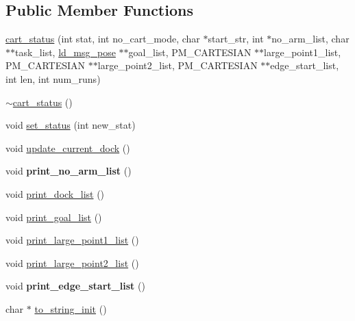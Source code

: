 \subsection*{Public Member Functions}
\begin{DoxyCompactItemize}
\item 
\mbox{\hyperlink{classcart__status_ac9302583f7f24fbc6c205a81416ff397}{cart\+\_\+status}} (int stat, int no\+\_\+cart\+\_\+mode, char $\ast$start\+\_\+str, int $\ast$no\+\_\+arm\+\_\+list, char $\ast$$\ast$task\+\_\+list, \mbox{\hyperlink{structld__msg__pose}{ld\+\_\+msg\+\_\+pose}} $\ast$$\ast$goal\+\_\+list, P\+M\+\_\+\+C\+A\+R\+T\+E\+S\+I\+AN $\ast$$\ast$large\+\_\+point1\+\_\+list, P\+M\+\_\+\+C\+A\+R\+T\+E\+S\+I\+AN $\ast$$\ast$large\+\_\+point2\+\_\+list, P\+M\+\_\+\+C\+A\+R\+T\+E\+S\+I\+AN $\ast$$\ast$edge\+\_\+start\+\_\+list, int len, int num\+\_\+runs)
\item 
\mbox{\hyperlink{classcart__status_a36ae36b8682afa50ecaa568285b1b32c}{$\sim$cart\+\_\+status}} ()
\item 
void \mbox{\hyperlink{classcart__status_a5db1241aff0bd874c8d108666ec8b323}{set\+\_\+status}} (int new\+\_\+stat)
\item 
void \mbox{\hyperlink{classcart__status_a25c8b8f4c2d8b516284f9cb463f007a8}{update\+\_\+current\+\_\+dock}} ()
\item 
\mbox{\label{classcart__status_adec6fe0924beb76adcc53ad15b9a2034}} 
void {\bfseries print\+\_\+no\+\_\+arm\+\_\+list} ()
\item 
void \mbox{\hyperlink{classcart__status_ae58ecd2c7d79aa9d35eec0bbfd1c7a32}{print\+\_\+dock\+\_\+list}} ()
\item 
void \mbox{\hyperlink{classcart__status_a07d3f2bf7b4e430645ae22ffb46143cb}{print\+\_\+goal\+\_\+list}} ()
\item 
void \mbox{\hyperlink{classcart__status_a9decf11bef6e36c350463102401c247e}{print\+\_\+large\+\_\+point1\+\_\+list}} ()
\item 
void \mbox{\hyperlink{classcart__status_a8a6a9273616bef95c4d0aeccb2524aaa}{print\+\_\+large\+\_\+point2\+\_\+list}} ()
\item 
\mbox{\label{classcart__status_a52ef441e0a19a051270909656efbc30e}} 
void {\bfseries print\+\_\+edge\+\_\+start\+\_\+list} ()
\item 
char $\ast$ \mbox{\hyperlink{classcart__status_ae7c18dab45a356066eb36b81b985194f}{to\+\_\+string\+\_\+init}} ()
$$
\end{DoxyCompactItemize}
